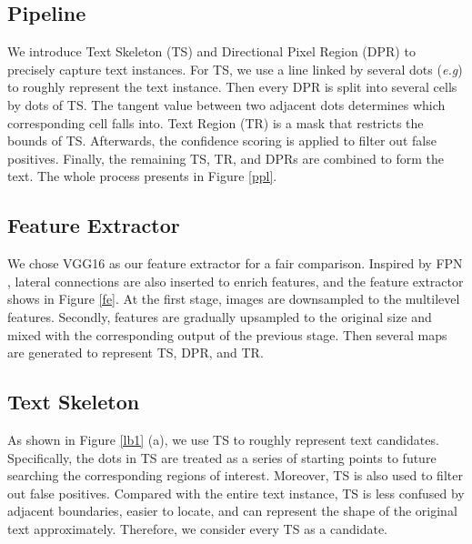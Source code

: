 \documentclass{bmvc2k}
\def\eg{\emph{e.g}\bmvaOneDot}
\begin{document}
\subsection{Pipeline}
We introduce Text Skeleton (TS) and Directional Pixel Region (DPR) to precisely capture text instances. For TS, we use a line linked by several dots (\eg{15}) to roughly represent the text instance. Then every DPR is split into several cells by dots of TS. The tangent value between two adjacent dots determines which corresponding cell falls into. Text Region (TR) is a mask that restricts the bounds of TS. Afterwards, the confidence scoring is applied to filter out false positives. Finally, the remaining TS, TR, and DPRs are combined to form the text. The whole process presents in Figure \ref{ppl}.
\subsection{Feature Extractor}
 We chose VGG16 \cite{simonyan2014very} as our feature extractor for a fair comparison. Inspired by FPN \cite{Lin2017Feature}, lateral connections are also inserted to enrich features, and the feature extractor shows in Figure \ref{fe}. At the first stage, images are downsampled to the multilevel features. Secondly, features are gradually upsampled to the original size and mixed with the corresponding output of the previous stage. Then several maps are generated to represent TS, DPR, and TR.
   \begin{figure*}[!ht]
            \begin{center}
            \end{center}
               \caption{Feature Extractor}
            \label{fe}
            \end{figure*}
    \subsection{Text Skeleton}
As shown in Figure \ref{lb1} (a), we use TS to roughly represent text candidates. Specifically, the dots in TS are treated as a series of starting points to future searching the corresponding regions of interest. Moreover, TS is also used to filter out false positives. Compared with the entire text instance, TS is less confused by adjacent boundaries, easier to locate, and can represent the shape of the original text approximately. Therefore, we consider every TS as a candidate.
\end{document}
